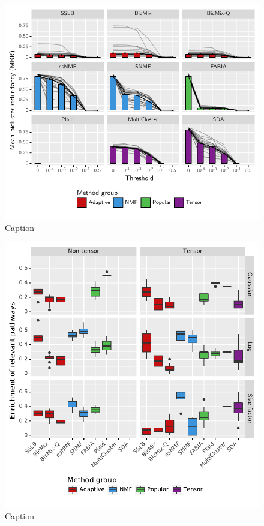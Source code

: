 \documentclass[xcolor=table,final]{beamer}
\newlength{\onecolwid}
\newlength{\twocolwid}
\begin{document}
\begin{frame}[t]
\begin{columns}[t]
\begin{column}{\twocolwid}
\begin{columns}
\begin{column}{\onecolwid}
\begin{figure}
\includegraphics[width=0.9 \textwidth]{plots/threshold_adjusted_redundancy_mean_lines.pdf}
\caption{Caption}
\end{figure}

\begin{figure}
\includegraphics[width=0.9 \textwidth]{plots/compare_samegenes_K_50_datasets_ko_traits_nz_alpha_0-05.pdf}
\caption{Caption}
\end{figure}


\end{column}
\end{columns}
\end{column}
\end{columns}
\end{frame}
\end{document}
